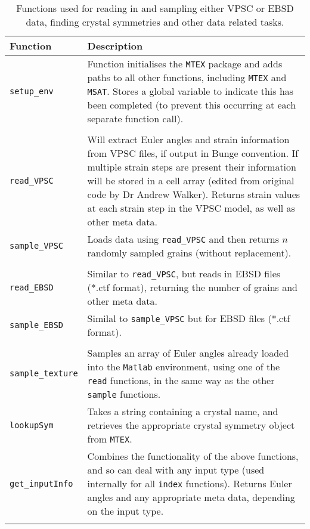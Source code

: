 \documentclass[a4paper,12pt,twoside]{report}
\numberwithin{equation}{chapter}
\begin{document}
\begin{table}[h!] 
	\centering
	\caption[Functions: reading \& sampling]{Functions used for reading in and sampling either VPSC or EBSD data, finding crystal symmetries and other data related tasks.}
	\noindent
	
\begin{tabularx}{\textwidth}{lX}

\hline
\hline
Function    & Description   \\ 
\hline
\hline

\texttt{setup\_{}env} & Function initialises the \texttt{MTEX} package and adds paths to all other functions, including \texttt{MTEX} and \texttt{MSAT}. Stores a global variable to indicate this has been completed (to prevent this occurring at each separate function call). \\  
\\
\hline

\texttt{read\_{}VPSC} & Will extract Euler angles and strain information from VPSC files, if output in Bunge convention. If multiple strain steps are present their information will be stored in a cell array (edited from original code by Dr Andrew Walker). Returns strain values at each strain step in the VPSC model, as well as other meta data. \\ 

\texttt{sample\_{}VPSC} & Loads data using \texttt{read\_{}VPSC} and then returns $n$ randomly sampled grains (without replacement). \\  
\\
\hline

\texttt{read\_{}EBSD} & Similar to \texttt{read\_{}VPSC}, but reads in EBSD files (*.ctf format), returning the number of grains and other meta data. \\

\texttt{sample\_{}EBSD} & Similal to \texttt{sample\_{}VPSC} but for EBSD files (*.ctf format). \\ 
\\
\hline

\texttt{sample\_{}texture} & Samples an array of Euler angles already loaded into the \texttt{Matlab} environment, using one of the \texttt{read} functions, in the same way as the other \texttt{sample} functions. \\

\texttt{lookupSym} & Takes a string containing a crystal name, and retrieves the appropriate crystal symmetry object from \texttt{MTEX}. \\

\texttt{get\_{}inputInfo} & Combines the functionality of the above functions, and so can deal with any input type (used internally for all \texttt{index} functions). Returns Euler angles and any appropriate meta data, depending on the input type. \\
\\
\hline
\hline

\end{tabularx}
\label{tab:read_functions}
\end{table}
\end{document}
